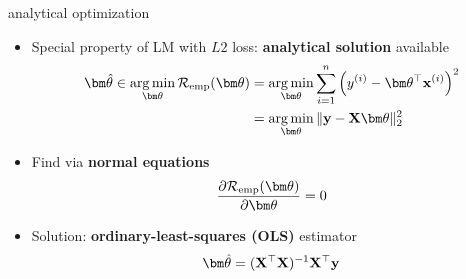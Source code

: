 \documentclass[11pt,compress,t,notes=noshow, xcolor=table]{beamer}
\begin{document}



\begin{vbframe}{analytical optimization}

\begin{itemize}
    \item Special property of LM with $L2$ loss: \textbf{analytical solution}
    available
    \begin{align*}
        \thetavh \in 
        \argmin_{\thetav} \risket &=
        \argmin_{\thetav} \sumin \left(\yi - \thetav^\top \xi \right)^2  \\
        &= \argmin_{\thetav} \| \yv - \Xmat \thetav \|^2_2
    \end{align*}
    \normalsize
    \item Find via \textbf{normal equations}
    $$\pd{\risket}{\thetav} = 0$$
    \item Solution: \textbf{ordinary-least-squares (OLS)} estimator
    $$\thetavh = \olsest$$
\end{itemize}

\end{vbframe}

\end{document}
